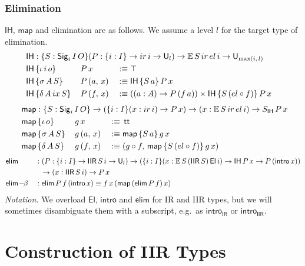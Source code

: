 \documentclass[acmsmall,screen,review,anonymous]{acmart}
\newcommand{\msf}[1]{{\mathsf{#1}}}
\newcommand{\mbb}[1]{\mathbb{#1}}
\newcommand{\U}{\msf{U}}
\newcommand{\El}{\msf{El}}
\newcommand{\Sig}{\msf{Sig}}
\newcommand{\ttt}{\msf{tt}}
\newcommand{\ir}{{ir}}
\newcommand{\el}{{el}}
\newcommand{\ix}{{ix}}
\newcommand{\IR}{\msf{IR}}
\newcommand{\intro}{\msf{intro}}
\newcommand{\IH}{\msf{IH}}
\newcommand{\map}{\msf{map}}
\newcommand{\elim}{\msf{elim}}
\newcommand{\IIR}{\msf{IIR}}
\newcommand{\E}{\mbb{E}}
\begin{document}
\subsubsection{Elimination}\label{sec:iir-elimination} $\IH$, $\map$ and elimination are
as follows. We assume a level $l$ for the target type of elimination.
\begin{alignat*}{3}
  &\rlap{$\IH : \{S : \Sig_i\,I\,O\}(P : \{i : I\}\to \ir\,i \to \U_l) \to \E\,S\,\ir\,\el\,i \to \U_{\max(i,\,l)}$} \\
  &\IH\,\{\iota\,i\,o      \}\,&&P\,x       &&:\equiv \top \\
  &\IH\,\{\sigma\,A\,S     \}\,&&P\,(a,\,x) &&:\equiv \IH\,\{S\,a\}\,P\,x \\
  &\IH\,\{\delta\,A\,\ix\,S\}\,&&P\,(f,\,x) &&:\equiv ((a : A) \to P\,(f\,a)) \times \IH\,\{S\,(\el \circ f)\}\,P\,x
\end{alignat*}
\begin{alignat*}{3}
  &\hspace{-7em}\rlap{$\map : \{S : \Sig_i\,I\,O\} \to (\{i : I\}(x : \ir\,i) \to P\,x) \to (x : \E\,S\,\ir\,\el\,i) \to S_\IH\,P\,x$} \\
  &\hspace{-7em}\map\,\{\iota\,o    \}\,&&g\,x       &&:\equiv\,\ttt \\
  &\hspace{-7em}\map\,\{\sigma\,A\,S\}\,&&g\,(a,\,x) &&:\equiv \map\,\{S\,a\}\,g\,x \\
  &\hspace{-7em}\map\,\{\delta\,A\,S\}\,&&g\,(f,\,x) &&:\equiv (g \circ f,\,\map\,\{S\,(\el \circ f)\}\,g\,x)
\end{alignat*}
\begin{alignat*}{3}
  &\elim           &&: (P : \{i : I\}\to \IIR\,S\,i \to \U_l) \to (\{i : I\}(x : \E\,S\,(\IIR\,S)\,\El\,i) \to \IH\,P\,x \to P\,(\intro\,x))\\
  &                && \hspace{0.7em}\to (x : \IIR\,S\,i) \to P\,x \\
  &\elim\!-\!\!\beta &&: \elim\,P\,f\,(\intro\,x) \equiv f\,x\,(\map\,(\elim\,P\,f)\,x)
\end{alignat*}
\emph{Notation.} We overload $\El$, $\intro$ and $\elim$ for IR and IIR types, but we will sometimes disambiguate them
with a subscript, e.g.\ as $\intro_\IR$ or $\intro_\IIR$.

\section{Construction of IIR Types}\label{sec:iir-construction}
\end{document}
